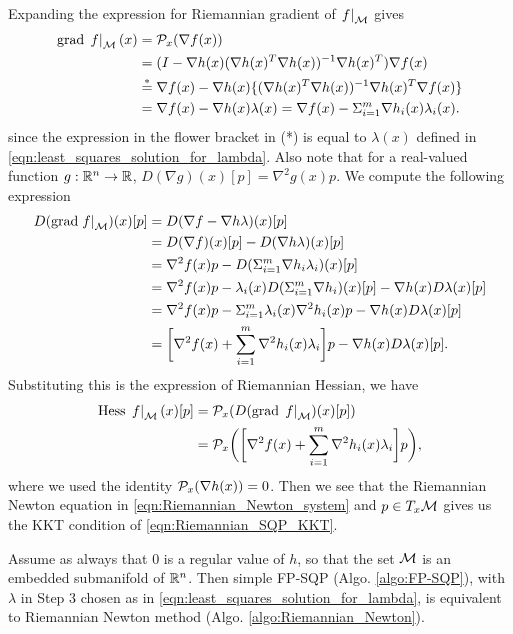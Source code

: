 \documentclass[11pt,a4paper]{article}
\begin{document}
Expanding the expression for Riemannian gradient of $\left.f\right|_{\mathcal{M}}$ gives
\begin{align*}
\text{grad}\,\left.f\right|_{\mathcal{M}}(x) =&\; \mathcal{P}_x(\nabla f(x))\\
=&\; (I - \nabla h(x)(\nabla h(x)^T\nabla h(x))^{-1}\nabla h(x)^T) \nabla f(x) \\
\overset{*}{=}&\; \nabla f(x) - \nabla h(x)\{(\nabla h(x)^T\nabla h(x))^{-1}\nabla h(x)^T \nabla f(x)\} \\
=&\; \nabla f(x) - \nabla h(x)\lambda(x) = \nabla f(x) - \Sigma_{i=1}^m\nabla h_i(x)\lambda_i(x).
\end{align*}
since the expression in the flower bracket in (*) is equal to $\lambda(x)$ defined in \eqref{eqn:least_squares_solution_for_lambda}. Also note that for a real-valued function $g:\mathbb{R}^n\rightarrow \mathbb{R}$, $D(\nabla g)(x)[p] = \nabla^2 g(x)p$. We compute the following expression
\begin{align*}
D(\text{grad}\left.f\right|_{\mathcal{M}})(x)[p] 
=&\; D(\nabla f - \nabla h\lambda)(x)[p] \\
=&\; D(\nabla f)(x)[p] - D(\nabla h\lambda)(x)[p] \\
=&\; \nabla^2 f(x)p - D(\Sigma_{i=1}^m\nabla h_i\lambda_i)(x)[p] \\
=&\; \nabla^2 f(x)p - \lambda_i(x)D(\Sigma_{i=1}^m\nabla h_i)(x)[p] - \nabla h(x)D\lambda(x)[p] \\
=&\; \nabla^2 f(x)p - \Sigma_{i=1}^m\lambda_i(x)\nabla^2 h_i(x)p - \nabla h(x)D\lambda(x)[p] \\
=&\; \bigg[\nabla^2 f(x)+\sum_{i=1}^m\nabla^2 h_i(x)\lambda_i\bigg]p - \nabla h(x)D\lambda(x)[p].
\end{align*}
Substituting this is the expression of Riemannian Hessian, we have
\begin{align*}
\text{Hess}\,\left.f\right|_{\mathcal{M}}(x)[p] =&\; \mathcal{P}_x(D(\text{grad}\,\left.f\right|_{\mathcal{M}})(x)[p]) \\
=&\; \mathcal{P}_x\bigg(\bigg[\nabla^2 f(x)+\sum_{i=1}^m\nabla^2 h_i(x)\lambda_i\bigg]p\bigg),
\end{align*}
where we used the identity $\mathcal{P}_x(\nabla h(x)) = 0$. Then we see that the Riemannian Newton equation in \eqref{eqn:Riemannian_Newton_system} and $p\in T_x\mathcal{M}$ gives us the KKT condition of \eqref{eqn:Riemannian_SQP_KKT}.

\begin{prop}
Assume as always that $0$ is a regular value of $h$, so that the set $\mathcal{M}$ is an embedded submanifold of $\mathbb{R}^n$. Then simple FP-SQP (Algo. \ref{algo:FP-SQP}), with $\lambda$ in Step 3 chosen as in \eqref{eqn:least_squares_solution_for_lambda}, is equivalent to Riemannian Newton method (Algo. \ref{algo:Riemannian_Newton}). \end{prop}
\end{document}
